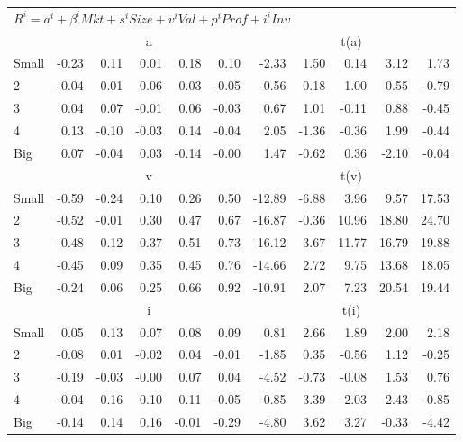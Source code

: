 \begin{table}[!ht]
\begin{tabular}{lrrrrrrrrrr}
  \midrule 
  \multicolumn{11}{l}{$R^i=a^i+\beta^iMkt+s^iSize+v^iVal+p^iProf+i^iInv$}  \\
  
     & \multicolumn{5}{c}{a} & \multicolumn{5}{c}{t(a)}   \\
     \cmidrule(r){2-6} \cmidrule(r){7-11} 
    Small  & -0.23  & 0.11  & 0.01  & 0.18  & 0.10  & -2.33  & 1.50  & 0.14  & 3.12  & 1.73   \\
    2  & -0.04  & 0.01  & 0.06  & 0.03  & -0.05  & -0.56  & 0.18  & 1.00  & 0.55  & -0.79   \\
    3  & 0.04  & 0.07  & -0.01  & 0.06  & -0.03  & 0.67  & 1.01  & -0.11  & 0.88  & -0.45   \\
    4  & 0.13  & -0.10  & -0.03  & 0.14  & -0.04  & 2.05  & -1.36  & -0.36  & 1.99  & -0.44   \\
    Big  & 0.07  & -0.04  & 0.03  & -0.14  & -0.00  & 1.47  & -0.62  & 0.36  & -2.10  & -0.04   \\
    
  
     & \multicolumn{5}{c}{v} & \multicolumn{5}{c}{t(v)}   \\
     \cmidrule(r){2-6} \cmidrule(r){7-11} 
    Small  & -0.59  & -0.24  & 0.10  & 0.26  & 0.50  & -12.89  & -6.88  & 3.96  & 9.57  & 17.53   \\
    2  & -0.52  & -0.01  & 0.30  & 0.47  & 0.67  & -16.87  & -0.36  & 10.96  & 18.80  & 24.70   \\
    3  & -0.48  & 0.12  & 0.37  & 0.51  & 0.73  & -16.12  & 3.67  & 11.77  & 16.79  & 19.88   \\
    4  & -0.45  & 0.09  & 0.35  & 0.45  & 0.76  & -14.66  & 2.72  & 9.75  & 13.68  & 18.05   \\
    Big  & -0.24  & 0.06  & 0.25  & 0.66  & 0.92  & -10.91  & 2.07  & 7.23  & 20.54  & 19.44   \\


     & \multicolumn{5}{c}{i} & \multicolumn{5}{c}{t(i)}   \\
     \cmidrule(r){2-6} \cmidrule(r){7-11} 
    Small  & 0.05  & 0.13  & 0.07  & 0.08  & 0.09  & 0.81  & 2.66  & 1.89  & 2.00  & 2.18   \\
    2  & -0.08  & 0.01  & -0.02  & 0.04  & -0.01  & -1.85  & 0.35  & -0.56  & 1.12  & -0.25   \\
    3  & -0.19  & -0.03  & -0.00  & 0.07  & 0.04  & -4.52  & -0.73  & -0.08  & 1.53  & 0.76   \\
    4  & -0.04  & 0.16  & 0.10  & 0.11  & -0.05  & -0.85  & 3.39  & 2.03  & 2.43  & -0.85   \\
    Big  & -0.14  & 0.14  & 0.16  & -0.01  & -0.29  & -4.80  & 3.62  & 3.27  & -0.33  & -4.42   \\
    

  \bottomrule
\end{tabular}
\label{tbl:Size_BM}
\end{table}
